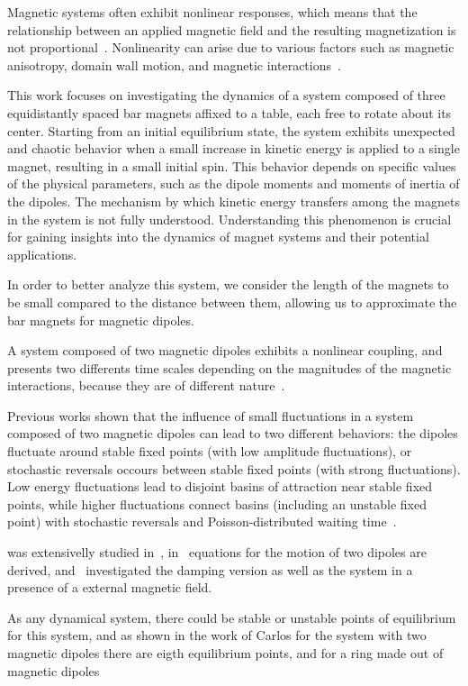 Magnetic systems often exhibit nonlinear responses, which means that the relationship between an applied magnetic field and the resulting magnetization is not proportional~\cite{nonlinearResponse}. Nonlinearity can arise due to various factors such as magnetic anisotropy, domain wall motion, and magnetic interactions~\cite{HORVATH2022119279}.

This work focuses on investigating the dynamics of a system composed of three equidistantly spaced bar magnets affixed to a table, each free to rotate about its center. Starting from an initial equilibrium state, the system exhibits unexpected and chaotic behavior when a small increase in kinetic energy is applied to a single magnet, resulting in a small initial spin. This behavior depends on specific values of the physical parameters, such as the dipole moments and moments of inertia of the dipoles. The mechanism by which kinetic energy transfers among the magnets in the system is not fully understood. Understanding this phenomenon is crucial for gaining insights into the dynamics of magnet systems and their potential applications.

In order to better analyze this system, we consider the length of the magnets to be small compared to the distance between them, allowing us to approximate the bar magnets for magnetic dipoles.

A system composed of two magnetic dipoles exhibits a nonlinear coupling, and presents two differents time scales depending on the magnitudes of the magnetic interactions, because they are of different nature~\cite{LAROZE20081440}. 

Previous works shown that the influence of small fluctuations in a system composed of two magnetic dipoles can lead to two different behaviors: the dipoles fluctuate around stable fixed points (with low amplitude fluctuations), or stochastic reversals occours between stable fixed points (with strong fluctuations). Low energy fluctuations lead to disjoint basins of attraction near stable fixed points, while higher fluctuations connect basins (including an unstable fixed point) with stochastic reversals and Poisson-distributed waiting time~\cite{StochasticReversalDynamics}. 


was extensivelly studied in~\cite{yung1970analytic, ku2016interaction, santos2019dinamica}, in~\cite{yung1970analytic} equations for the motion of two dipoles are derived, and~\cite{ku2016interaction, santos2019dinamica} investigated the damping version as well as the system in a presence of a external magnetic field.



As any dynamical system, there could be stable or unstable points of equilibrium for this system, and as shown in the work of Carlos for the system with two magnetic dipoles there are eigth equilibrium points, and for a ring made out of magnetic dipoles 
